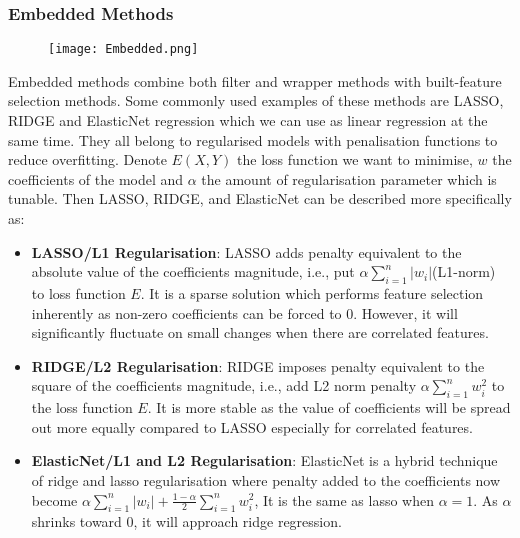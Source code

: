 \subsubsection{Embedded Methods}
 \begin{figure}[H]
  \centering
  \texttt{[image: Embedded.png]}
\end{figure}
Embedded methods combine both filter and wrapper methods with built-feature selection methods. Some commonly used examples of these methods are LASSO, RIDGE and ElasticNet regression which we can use as linear regression at the same time. They all belong to regularised models with penalisation functions to reduce overfitting. Denote $E(X,Y)$ the loss function we want to minimise, $w$ the coefficients of the model and $\alpha$ the amount of regularisation parameter which is tunable. Then LASSO, RIDGE, and ElasticNet can be described more specifically as: 
\begin{itemize}
   \item \textbf{LASSO/L1 Regularisation}: LASSO adds penalty equivalent to the absolute value of the coefficients magnitude, i.e., put $\alpha\sum_{i=1}^{n}|w_i|$(L1-norm) to loss function $E$. It is a sparse solution which performs feature selection inherently as non-zero coefficients can be forced to 0. However, it will significantly fluctuate on small changes when there are correlated features. 
    \item \textbf{RIDGE/L2 Regularisation}: RIDGE imposes penalty equivalent to the square of the coefficients magnitude, i.e., add L2 norm penalty $\alpha\sum_{i=1}^{n}w_i^2$ to the loss function $E$. It is more stable as the value of coefficients will be spread out more equally compared to LASSO especially for correlated features. 
     \item \textbf{ElasticNet/L1 and L2 Regularisation}: ElasticNet is a hybrid technique of ridge and lasso regularisation where penalty added to the coefficients now become $\alpha\sum_{i=1}^{n}|w_i|+\frac{1-\alpha}{2}\sum_{i=1}^{n}w_i^2$, It is the same as lasso when $\alpha = 1$. As $\alpha$ shrinks toward 0, it will approach ridge regression. 
\end{itemize}

